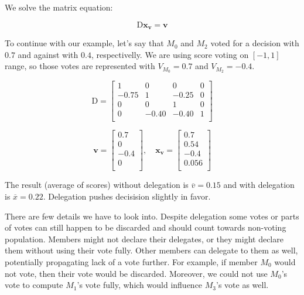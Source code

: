 \documentclass{sigchi}
\begin{document}
We solve the matrix equation:

\begin{displaymath}
\mathrm{D} \mathbf{x_v} = \mathbf{v}
\end{displaymath}

To continue with our example, let's say that $M_0$ and $M_2$ voted for a decision with $0.7$ and against with $0.4$,
respectivelly.
We are using score voting on $[-1, 1]$ range, so those votes are represented with $V_{M_0} = 0.7$ and
$V_{M_2} = -0.4$.

\begin{displaymath}
\mathrm{D} = \left[ \begin{array}{cccc}
1 & 0 & 0 & 0 \\
-0.75 & 1 & -0.25 & 0 \\
0 & 0 & 1 & 0 \\
0 & -0.40 & -0.40 & 1 \\
\end{array} \right]
\end{displaymath}

\begin{displaymath}
\mathbf{v} = \left[ \begin{array}{c}
0.7 \\
0 \\
-0.4 \\
0 \\
\end{array} \right],\quad \mathbf{x_v} = \left[ \begin{array}{c}
0.7 \\
0.54 \\
-0.4 \\
0.056 \\
\end{array} \right]
\end{displaymath}

The result (average of scores) without delegation is $\overline{v} = 0.15$ and
with delegation is $\overline{x} = 0.22$.
Delegation pushes decisision slightly in favor.

There are few details we have to look into.
Despite delegation some votes or parts of votes can still happen to be discarded and should count
towards non-voting population.
Members might not declare their delegates, or they might declare them without using their vote fully.
Other members can delegate to them as well, potentially propagating lack of a vote further.
For example, if member $M_0$ would not vote, then their vote would be discarded.
Moreover, we could not use $M_0$'s vote to compute $M_1$'s vote fully, which would influence $M_3$'s vote as well.
\end{document}
